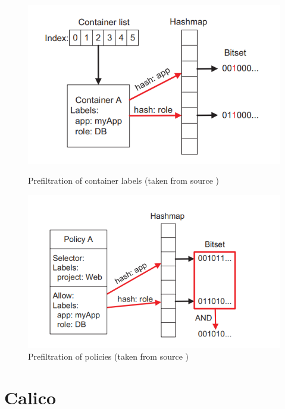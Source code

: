 \begin{figure}[htbp]
  \centering
  \begin{minipage}[b]{0.45\linewidth}
    \centering
    \includegraphics[width=\textwidth]{images/prefil_cont_labels.png}
    \caption{Prefiltration of container labels (taken from source \cite{kano})}
    \label{fig:kano-cont-prefiltration}
  \end{minipage}
  \quad %
  \begin{minipage}[b]{0.45\linewidth}
    \centering
    \includegraphics[width=\textwidth]{images/prefil_pols.png}
    \caption{Prefiltration of policies (taken from source \cite{kano})}
    \label{fig:kano-pol-prefiltration}
  \end{minipage}
\end{figure}


\section{Calico}\label{sec:calico}

